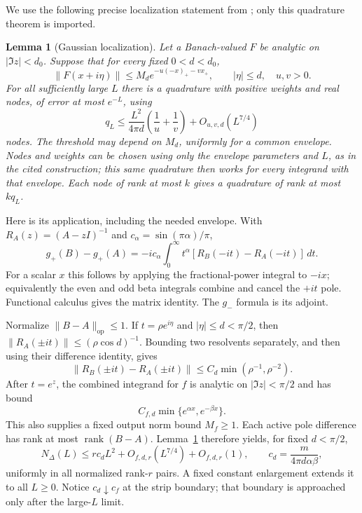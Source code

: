 \documentclass[11pt]{article}
\newtheorem{lemma}[theorem]{Lemma}
\numberwithin{equation}{section}
\newcommand{\rank}{\operatorname{rank}}
\newcommand{\op}{\mathrm{op}}
\begin{document}
We use the following precise localization statement from
\cite[Lemma 3.1]{Companion}; only this quadrature theorem is imported.
\begin{lemma}[Gaussian localization]\label{lem:gaussian}
Let a Banach-valued $F$ be analytic on $|\Im z|<d_0$. Suppose that for
every fixed $0<d<d_0$,
\[
 \|F(x+i\eta)\|\le M_d e^{-u(-x)_+-v x_+},
 \qquad |\eta|\le d,\quad u,v>0.
\]
For all sufficiently large $L$ there is a quadrature with positive
weights and real nodes, of error at most $e^{-L}$, using
\begin{equation}\label{eq:qnodes}
 q_L\le\frac{L^2}{4\pi d}\left(\frac1u+\frac1v\right)
                    +O_{u,v,d}(L^{7/4})
\end{equation}
nodes. The threshold may depend on $M_d$, uniformly for a common
envelope. Nodes and weights can be chosen using only the envelope
parameters and $L$, as in the cited construction; this same quadrature
then works for every integrand with that envelope.
Each node of rank at most $k$ gives a quadrature of rank
at most $kq_L$.
\end{lemma}

Here is its application, including the needed envelope. With
$R_A(z)=(A-zI)^{-1}$ and $c_\alpha=\sin(\pi\alpha)/\pi$,
\begin{equation}\label{eq:onepole}
 g_+(B)-g_+(A)=-i c_\alpha\int_0^\infty t^\alpha
                  [R_B(-it)-R_A(-it)]\,dt.
\end{equation}
For a scalar $x$ this follows by applying the fractional-power integral
to $-ix$; equivalently the even and odd beta integrals combine and
cancel the $+it$ pole. Functional calculus gives the matrix identity.
The $g_-$ formula is its adjoint.

Normalize $\|B-A\|_\op\le1$. If $t=\rho e^{i\eta}$ and
$|\eta|\le d<\pi/2$, then
$\|R_A(\pm it)\|\le(\rho\cos d)^{-1}$. Bounding two resolvents
separately, and then using their difference identity, gives
\[
 \|R_B(\pm it)-R_A(\pm it)\|
 \le C_d\min(\rho^{-1},\rho^{-2}).
\]
After $t=e^z$, the combined integrand for $f$ is analytic on
$|\Im z|<\pi/2$ and has bound
\[
 C_{f,d}\min\{e^{\alpha x},e^{-\beta x}\}.
\]
This also supplies a fixed output norm bound $M_f\ge1$.
Each active pole difference has rank at most $\rank(B-A)$.
Lemma~\ref{lem:gaussian} therefore yields, for fixed $d<\pi/2$,
\begin{equation}\label{eq:uppercount}
 N_\Delta(L)\le r c_d L^2+O_{f,d,r}(L^{7/4})+O_{f,d,r}(1),
 \qquad c_d=\frac{m}{4\pi d\alpha\beta},
\end{equation}
uniformly in all normalized rank-$r$ pairs. A fixed constant enlargement
extends it to all $L\ge0$. Notice $c_d\downarrow c_f$ at the strip
boundary; that boundary is approached only after the large-$L$ limit.
\end{document}
